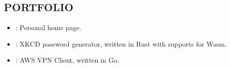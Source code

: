 \subsection*{PORTFOLIO}

\begin{itemize}[leftmargin=*,labelsep=1mm]
  \setlength{\parskip}{0mm}
  \setlength{\itemsep}{1mm}
  \item \href{https://ethanify.me}{}: Personal home page.
  
  \item \href{https://xkpasswd.github.io}{}: XKCD password generator, written in Rust with supports for Wasm.

  \item \href{https://github.com/ethan605/aws-vpn-client}{}: AWS VPN Client, written in Go.
\end{itemize}
